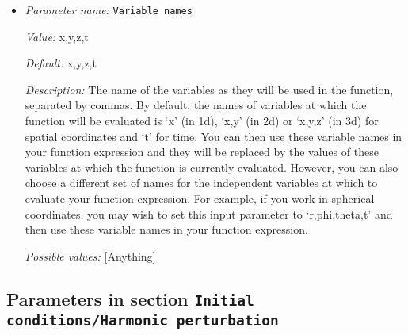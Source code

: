\begin{itemize}
{\it Possible values:} [Anything]
\item {\it Parameter name:} {\tt Variable names}
\label{parameters:Initial conditions/Function/Variable names}


{\it Value:} x,y,z,t


{\it Default:} x,y,z,t


{\it Description:} The name of the variables as they will be used in the function, separated by commas. By default, the names of variables at which the function will be evaluated is `x' (in 1d), `x,y' (in 2d) or `x,y,z' (in 3d) for spatial coordinates and `t' for time. You can then use these variable names in your function expression and they will be replaced by the values of these variables at which the function is currently evaluated. However, you can also choose a different set of names for the independent variables at which to evaluate your function expression. For example, if you work in spherical coordinates, you may wish to set this input parameter to `r,phi,theta,t' and then use these variable names in your function expression.


{\it Possible values:} [Anything]
\end{itemize}

\subsection{Parameters in section \tt Initial conditions/Harmonic perturbation}
\label{parameters:Initial_20conditions/Harmonic_20perturbation}

